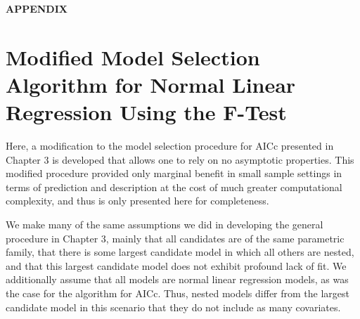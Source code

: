 \renewcommand{\theequation}{A.\arabic{equation}}
\setcounter{equation}{0}
\begin{center}
\textbf{APPENDIX}
\end{center}
\doublespace
\phantom{a}
\phantom{a}
\noindent

\section*{Modified Model Selection Algorithm for Normal Linear Regression Using the F-Test}

Here, a modification to the model selection procedure for AICc presented in Chapter 3 is developed that allows one to rely on no asymptotic properties.
This modified procedure provided only marginal benefit in small sample settings in terms of prediction and description at the cost of much
greater computational complexity, and thus is only presented here for completeness.

We make many of the same assumptions we did in developing the general procedure in Chapter 3, mainly that all candidates are of the same parametric
family, that there is some largest candidate model in which all others are nested, and that this largest candidate model does not exhibit
profound lack of fit. We additionally assume that all models are normal linear regression models, as was the case for the algorithm for
AICc. Thus, nested models differ from the largest candidate model in this scenario that they do not include as many covariates.

